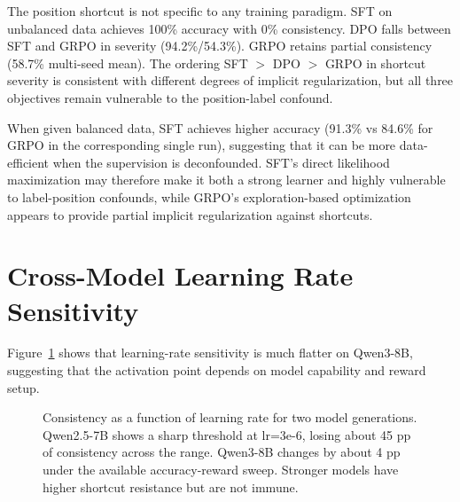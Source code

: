 \documentclass[letterpaper]{article}
\begin{document}
The position shortcut is not specific to any training paradigm. SFT on unbalanced data achieves 100\% accuracy with 0\% consistency. DPO falls between SFT and GRPO in severity (94.2\%/54.3\%). GRPO retains partial consistency (58.7\% multi-seed mean). The ordering SFT $>$ DPO $>$ GRPO in shortcut severity is consistent with different degrees of implicit regularization, but all three objectives remain vulnerable to the position-label confound.

When given balanced data, SFT achieves higher accuracy (91.3\% vs 84.6\% for GRPO in the corresponding single run), suggesting that it can be more data-efficient when the supervision is deconfounded. SFT's direct likelihood maximization may therefore make it both a strong learner and highly vulnerable to label-position confounds, while GRPO's exploration-based optimization appears to provide partial implicit regularization against shortcuts.

\section{Cross-Model Learning Rate Sensitivity}
\label{app:crosslr}

Figure~\ref{fig:crosslr} shows that learning-rate sensitivity is much flatter on Qwen3-8B, suggesting that the activation point depends on model capability and reward setup.

\begin{figure}[htbp]
\centering
{}
\caption{Consistency as a function of learning rate for two model generations. Qwen2.5-7B shows a sharp threshold at lr=3e-6, losing about 45 pp of consistency across the range. Qwen3-8B changes by about 4 pp under the available accuracy-reward sweep. Stronger models have higher shortcut resistance but are not immune.}
\label{fig:crosslr}
\end{figure}
\end{document}
